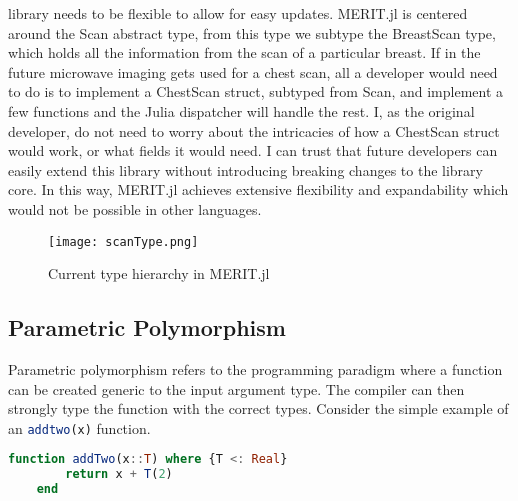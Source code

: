 library needs to be flexible to allow for easy updates. MERIT.jl is centered around the Scan abstract type, from this
type we subtype the BreastScan type, which holds all the information from the scan of a particular breast. If in the
future microwave imaging gets used for a chest scan, all a developer would need to do is to implement a ChestScan
struct, subtyped from Scan, and implement a few functions and the Julia dispatcher will handle the rest. I, as the
original developer, do not need to worry about the intricacies of how a ChestScan struct would work, or what fields it
would need. I can trust that future developers can easily extend this library without introducing breaking changes to
the library core. In this way, MERIT.jl achieves extensive flexibility and expandability which would not be possible in
other languages.  \hfill \break

\begin{figure}[h]
    \texttt{[image: scanType.png]}
    \centering
    \caption{Current type hierarchy in MERIT.jl} 
    \label{fig:scanType}
\end{figure}

\subsection{Parametric Polymorphism}
Parametric polymorphism refers to the programming paradigm where a function can be created generic to the input argument
type. The compiler can then strongly type the function with the correct types. Consider the simple example of an
\lstinline[language=Julia]{addtwo(x)} function.

\begin{lstlisting}[language=Julia]
    function addTwo(x::T) where {T <: Real}
        return x + T(2)
    end
\end{lstlisting}


